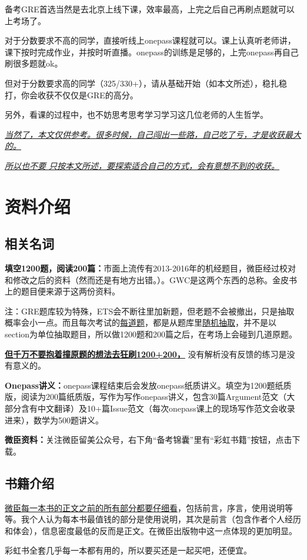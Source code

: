 \documentclass[cn,plain]{./src/qyxfbook}
\newcommand{\red}[1]{\textcolor[rgb]{1,0,0}{#1}}
\begin{document}
		
		备考GRE首选当然是去北京上线下课，效率最高，上完之后自己再刷点题就可以上考场了。\par
		对于分数要求不高的同学，直接听线上onepass课程就可以。课上认真听老师讲，课下按时完成作业，并按时听直播。onepass的训练是足够的，上完onepass再自己刷很多题就ok。\par
		但对于分数要求高的同学（325/330+），请从基础开始（如本文所述），稳扎稳打，你会收获不仅仅是GRE的高分。

		
		另外，看课的过程中，也不妨思考思考学习学习这几位老师的人生哲学。


		\underline{\itshape 当然了，本文仅供参考。很多时候，自己闯出一些路，自己吃了亏，才是收获最大的。}

		\underline{\itshape 所以也\LARGE 不要 只按本文所述，\normalsize 要\LARGE 探索\normalsize 适合自己的方式，会有意想不到的收获。}

\chapter{资料介绍}
		\section{相关名词}
			\textbf{填空1200题，阅读200篇：}市面上流传有2013-2016年的机经题目，微臣经过校对和修改之后的资料（然而还是有地方出错。）。GWC是这两个东西的总称。金皮书上的题目便来源于这两份资料。\par
			注：GRE题库较为特殊，ETS会不断往里加新题，但老题不会被撤出，只是抽取概率会小一点。而且每次考试的\underline{每道题}，都是从题库里\underline{随机抽取}，并不是以section为单位抽取题目，所以做1200题和200篇之后，在考场上会碰到几道原题。
			
			\red{\underline{\Large \bfseries 但千万不要抱着撞原题的想法去狂刷1200+200，}}
			没有解析没有反馈的练习是没有意义的。\par
			
			\textbf{Onepass讲义：}onepass课程结束后会发放onepass纸质讲义。填空为1200题纸质版，阅读为200篇纸质版，写作为写作onepass讲义，包含30篇Argument范文（大部分含有中文翻译）及10+篇Issue范文（每次onepass课上的现场写作范文会收录进来），数学为500题讲义。\par
			
			\textbf{微臣资料：}关注微臣留美公众号，右下角“备考锦囊”里有“彩虹书籍”按钮，点击下载。
		
	
		\section{书籍介绍}
			\underline{\Large 微臣每一本书的正文之前的所有部分都要仔细看}，包括前言，序言，使用说明等等。我个人认为每本书最值钱的部分是使用说明，其次是前言（包含作者个人经历和体会），信息密度最低的反而是正文。在微臣出版物中这一点体现的更加明显。\par
			彩虹书全套几乎每一本都有用的，所以要买还是一起买吧，还便宜。
\end{document}
